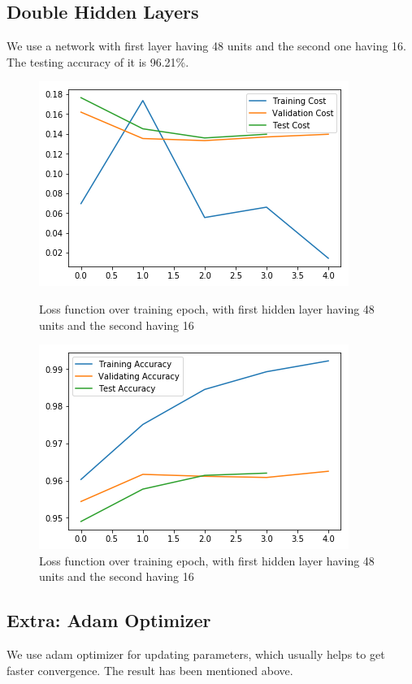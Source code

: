 \documentclass{article}
\begin{document}
\subsection{Double Hidden Layers}
We use a network with first layer having 48 units and the second one having 16. The testing accuracy of it is 96.21\%.
\begin{figure}[h]
	\begin{minipage}{0.48\textwidth}
	\centering
	\includegraphics[width=\textwidth]{pics/loss_double.png}
	\caption{Loss function over training epoch, with first hidden layer having 48 units and the second having 16}
	\end{minipage}\hfill
	\begin{minipage}{0.48\textwidth}
	\centering
	\includegraphics[width=\textwidth]{pics/acc_double.png}
	\caption{Loss function over training epoch, with first hidden layer having 48 units and the second having 16}
	\end{minipage}
\end{figure}

\subsection{Extra: Adam Optimizer}
We use adam optimizer for updating parameters, which usually helps to get faster convergence. The result has been mentioned above.  
\end{document}
